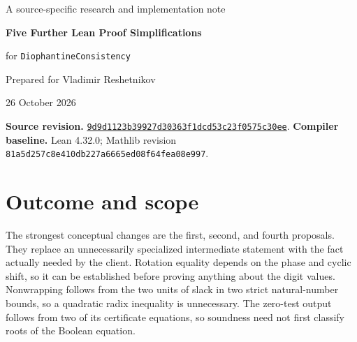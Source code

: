 \documentclass[11pt,letterpaper]{article}
\newcommand{\repo}{https://github.com/VladimirReshetnikov/ProveIt}
\newcommand{\pin}{9d9d1123b39927d30363f1dcd53c23f0575c30ee}
\begin{document}
\begin{center}
{\large\sffamily\color{ink}A source-specific research and implementation note}\par\vspace{8pt}
{\LARGE\bfseries Five Further Lean Proof Simplifications}\par\vspace{5pt}
{\Large for \texttt{DiophantineConsistency}}\par\vspace{10pt}
{\large Prepared for Vladimir Reshetnikov}\par
26 October 2026
\end{center}
\vspace{4pt}
\textbf{Source revision.} \href{\repo/commit/\pin}{\texttt{\pin}}.\newline
\textbf{Compiler baseline.} Lean 4.32.0; Mathlib revision
\texttt{81a5d257c8e410db227a6665ed08f64fea08e997}.

\begin{abstract}
This iteration treats every proposal in the two requested exclusion locations as available infrastructure, whether adopted or pending. It identifies five additional changes at six declarations: exact exponent normalization for the raw cyclic digit rotation; a stronger two-summand capacity bound for nonwrapping; internal quotient uniqueness by cancelling the common quotient contribution; zero-test soundness derived from its product and reconstruction equations; and direct linear arithmetic for the fixed controller progression. Five independent Lean files check the mathematical mechanisms, including copied production definitions where relevant. Four patch files propose edits to five production modules. Their complete-file line counts decrease from 783 to 763, charging the additional import in the zero-test module. This is a measured textual delta of the proposed patches, not a completed project integration or a build-time claim. The most useful gains are weaker proof dependencies and stronger intermediate statements; the immediate line savings are deliberately modest.
\end{abstract}

\section{Outcome and scope}

The strongest conceptual changes are the first, second, and fourth proposals. They replace an unnecessarily specialized intermediate statement with the fact actually needed by the client. Rotation equality depends on the phase and cyclic shift, so it can be established before proving anything about the digit values. Nonwrapping follows from the two units of slack in two strict natural-number bounds, so a quadratic radix inequality is unnecessary. The zero-test output follows from two of its certificate equations, so soundness need not first classify roots of the Boolean equation.
\end{document}
